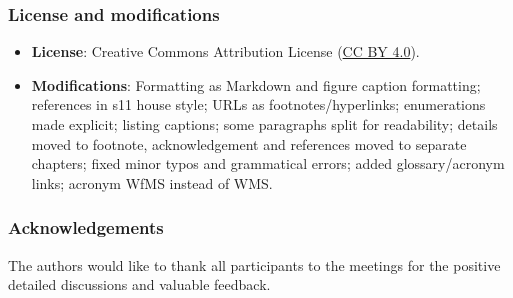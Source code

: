 \subsubsection*{License and modifications}

\begin{itemize}
\tightlist
\item
  \textbf{License}: Creative Commons Attribution License
  (\href{https://spdx.org/licenses/CC-BY-4.0}{CC BY 4.0}).
\item
  \textbf{Modifications}: Formatting as Markdown and figure caption formatting; references in s11 house style; URLs as footnotes/hyperlinks; enumerations made explicit; listing captions; some paragraphs split for readability; details moved to footnote, acknowledgement and references moved to separate chapters; fixed minor typos and grammatical errors; added glossary/acronym links; acronym WfMS instead of WMS.
\end{itemize}


\subsubsection*{Acknowledgements}

The authors would like to thank all participants to the 
meetings for the positive detailed discussions and
valuable feedback.

